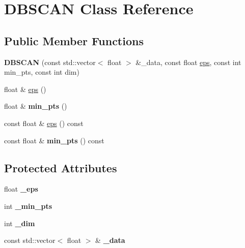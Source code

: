 \hypertarget{classDBSCAN}{}\section{D\+B\+S\+C\+A\+N Class Reference}
\label{classDBSCAN}
\subsection*{Public Member Functions}
\begin{DoxyCompactItemize}
\item 
\hypertarget{classDBSCAN_aa4de8fb630dbe6c15042c2283e7b4a60}{}{\bfseries D\+B\+S\+C\+A\+N} (const std\+::vector$<$ float $>$ \&\+\_\+data, const float \hyperlink{classDBSCAN_a3b455b232e38ffebc80e81782b78abbf}{eps}, const int min\+\_\+pts, const int dim)\label{classDBSCAN_aa4de8fb630dbe6c15042c2283e7b4a60}

\item 
float \& \hyperlink{classDBSCAN_a3b455b232e38ffebc80e81782b78abbf}{eps} ()
\item 
\hypertarget{classDBSCAN_a96999b24db2fb5a2731935190b727a42}{}float \& {\bfseries min\+\_\+pts} ()\label{classDBSCAN_a96999b24db2fb5a2731935190b727a42}

\item 
const float \& \hyperlink{classDBSCAN_a38e394f6c2be17c39a21f403d17932f9}{eps} () const 
\item 
\hypertarget{classDBSCAN_a41e51384471a32fcd59f7229a7979cf1}{}const float \& {\bfseries min\+\_\+pts} () const \label{classDBSCAN_a41e51384471a32fcd59f7229a7979cf1}

\end{DoxyCompactItemize}
\subsection*{Protected Attributes}
\begin{DoxyCompactItemize}
\item 
\hypertarget{classDBSCAN_a509e3960831c976805b9c83ebcd82735}{}float {\bfseries \+\_\+eps}\label{classDBSCAN_a509e3960831c976805b9c83ebcd82735}

\item 
\hypertarget{classDBSCAN_a62a7932b88a1d4311b533efa38c9700b}{}int {\bfseries \+\_\+min\+\_\+pts}\label{classDBSCAN_a62a7932b88a1d4311b533efa38c9700b}

\item 
\hypertarget{classDBSCAN_a3ca40201957cf715a727b039983d5e6d}{}int {\bfseries \+\_\+dim}\label{classDBSCAN_a3ca40201957cf715a727b039983d5e6d}

\item 
\hypertarget{classDBSCAN_ac1b6e7c55ca50a540339dbf803969d06}{}const std\+::vector$<$ float $>$ \& {\bfseries \+\_\+data}\label{classDBSCAN_ac1b6e7c55ca50a540339dbf803969d06}

\end{DoxyCompactItemize}


